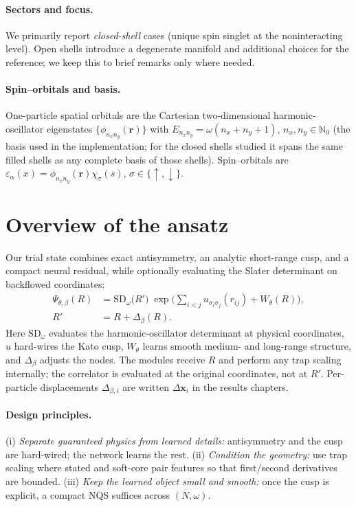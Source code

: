 \paragraph{Sectors and focus.}
We primarily report \emph{closed-shell} cases (unique spin singlet at the noninteracting level).
Open shells introduce a degenerate manifold and additional choices for the reference; we keep this
to brief remarks only where needed.

\paragraph{Spin–orbitals and basis.}
One-particle spatial orbitals are the Cartesian two-dimensional harmonic-oscillator
eigenstates $\{\phi_{n_x n_y}(\mathbf r)\}$ with $E_{n_x n_y}=\omega(n_x+n_y+1)$,
$n_x,n_y\in\mathbb N_0$ (the basis used in the implementation; for the closed shells studied
it spans the same filled shells as any complete basis of those shells). Spin–orbitals
are $\varepsilon_\alpha(x)=\phi_{n_x n_y}(\mathbf r)\chi_\sigma(s)$, $\sigma\in\{\uparrow,\downarrow\}$.


\section{Overview of the ansatz}
\label{sec:ansatz}
Our trial state combines exact antisymmetry, an analytic short-range cusp, and a compact
neural residual, while optionally evaluating the Slater determinant on backflowed coordinates:
\begin{align}
  \Psi_{\theta,\beta}(R)
  &= \mathrm{SD}_{\omega}\big(R'\big)\;
     \exp\!\Big(
       \sum_{i<j} u_{\sigma_i \sigma_j}(r_{ij})
       + W_\theta(R)
     \Big),\label{eq:ansatz-overall} \\
  R' &= R + \Delta_\beta(R).\label{eq:bf-coords}
\end{align}
Here $\mathrm{SD}_{\omega}$ evaluates the harmonic-oscillator determinant at physical
coordinates, $u$ hard-wires the Kato cusp, $W_\theta$ learns smooth medium- and long-range
structure, and $\Delta_\beta$ adjusts the nodes. The modules receive $R$ and perform any
trap scaling internally; the correlator is evaluated at the original coordinates, not at
$R'$. Per-particle displacements $\Delta_{\beta,i}$ are written $\Delta\mathbf{x}_i$ in the
results chapters.

\paragraph{Design principles.}
(i) \emph{Separate guaranteed physics from learned details:} antisymmetry and the cusp are hard-wired; the network learns the rest.
(ii) \emph{Condition the geometry:} use trap scaling where stated and soft-core pair features so that first/second derivatives are bounded.
(iii) \emph{Keep the learned object small and smooth:} once the cusp is explicit, a compact NQS suffices across $(N,\omega)$.

